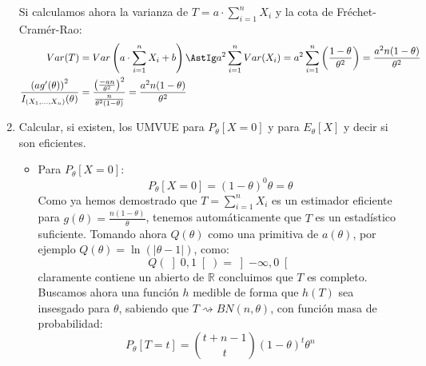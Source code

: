 \begin{ejercicio}
\begin{enumerate}[label=\alph*)]
            Si calculamos ahora la varianza de $T=a\cdot \sum\limits_{i=1}^n X_i$ y la cota de Fréchet-Cramér-Rao:
            \begin{align*}
                Var(T) &= Var\left(a\cdot \sum_{i=1}^{n}X_i+b\right) \AstIg a^2\sum_{i=1}^{n}Var(X_i) = a^2\sum_{i=1}^{n} \left(\frac{1-\theta}{\theta^2}\right) = \frac{a^2n(1-\theta)}{\theta^2} \\
                \frac{{(ag'(\theta))}^{2}}{I_{(X_1,\ldots,X_n)}(\theta)} &= \frac{{\left(\frac{-an}{\theta^2}\right)}^{2}}{\frac{n}{\theta^2(1-\theta)}} = \frac{a^2n(1-\theta)}{\theta^2}
            \end{align*}
        \item Calcular, si existen, los UMVUE para $P_\theta[X=0]$ y para $E_\theta[X]$ y decir si son eficientes. %
            \begin{itemize}
                \item Para $P_\theta[X=0]$:
                    \begin{equation*}
                        P_\theta[X=0] = {(1-\theta)}^{0}\theta = \theta
                    \end{equation*}
                    Como ya hemos demostrado que $T = \sum\limits_{i=1}^{n}X_i$ es un estimador eficiente para $g(\theta)=\frac{n(1-\theta)}{\theta}$, tenemos automáticamente que $T$ es un estadístico suficiente. Tomando ahora $Q(\theta)$ como una primitiva de $a(\theta)$, por ejemplo $Q(\theta) = \ln(|\theta-1|)$, como:
                    \begin{equation*}
                        Q(\left]0,1\right[) = \left]-\infty,0\right[
                    \end{equation*}
                    claramente contiene un abierto de $\mathbb{R}$ concluimos que $T$ es completo. Buscamos ahora una función $h$ medible de forma que $h(T)$ sea insesgado para $\theta$, sabiendo que $T\rightsquigarrow BN(n,\theta)$, con función masa de probabilidad:
                    \begin{equation*}
                        P_\theta[T = t] = \binom{t+n-1}{t} {(1-\theta)}^{t}\theta^n
                    \end{equation*}

\end{itemize}
\end{enumerate}
\end{ejercicio}
